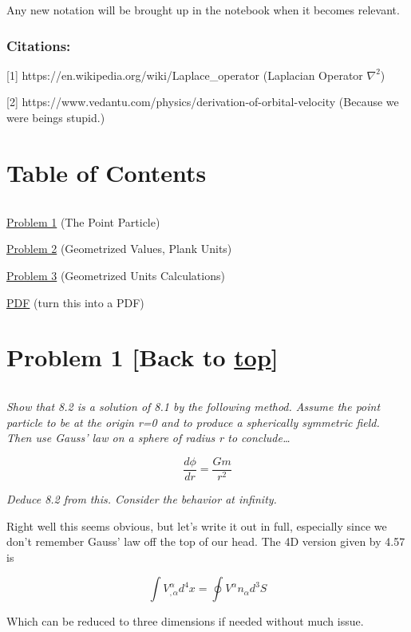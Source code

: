 \documentclass[landscape,letterpaper,10pt,english]{article}
\begin{document}
Any new notation will be brought up in the notebook when it becomes
relevant.

\hypertarget{citations}{%
\subsubsection{Citations:}\label{citations}}

{[}1{]} https://en.wikipedia.org/wiki/Laplace\_operator (Laplacian
Operator \(\nabla^2\))

{[}2{]} https://www.vedantu.com/physics/derivation-of-orbital-velocity
(Because we were beings stupid.)

    \hypertarget{table-of-contents}{%
\section{Table of Contents}\label{table-of-contents}}

\[\label{toc}\]

\hyperref[p1]{Problem 1} (The Point Particle)

\hyperref[p2]{Problem 2} (Geometrized Values, Plank Units)

\hyperref[p3]{Problem 3} (Geometrized Units Calculations)

\hyperref[latex_pdf_output]{PDF} (turn this into a PDF)

    \hypertarget{problem-1-back-to-top}{%
\section{\texorpdfstring{Problem 1 {[}Back to
\hyperref[toc]{top}{]}}{Problem 1 {[}Back to {]}}}\label{problem-1-back-to-top}}

\[\label{P1}\]

\emph{Show that 8.2 is a solution of 8.1 by the following method. Assume
the point particle to be at the origin r=0 and to produce a spherically
symmetric field. Then use Gauss' law on a sphere of radius r to
conclude\ldots{}}

\[\frac{d\phi}{dr} = \frac{Gm}{r^2}\]

\emph{Deduce 8.2 from this. Consider the behavior at infinity.}

    Right well this seems obvious, but let's write it out in full,
especially since we don't remember Gauss' law off the top of our head.
The 4D version given by 4.57 is

\[ \int V^\alpha_{,\alpha} d^4x = \oint V^\alpha n_\alpha d^3S \]

Which can be reduced to three dimensions if needed without much issue.
\end{document}
